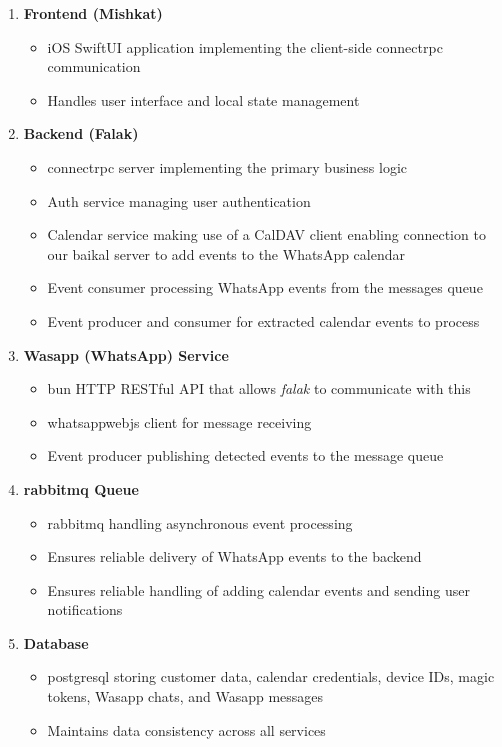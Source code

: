 \begin{enumerate}
    \item \textbf{Frontend (Mishkat)}
          \begin{itemize}
              \item iOS SwiftUI application implementing the client-side \gls{connectrpc} communication
              \item Handles user interface and local state management
          \end{itemize}

    \item \textbf{Backend (Falak)}
          \begin{itemize}
              \item \Gls{connectrpc} server implementing the primary business logic
              \item Auth service managing user authentication
              \item Calendar service making use of a CalDAV client enabling connection to our \Gls{baikal} server to add events to the WhatsApp calendar
              \item Event consumer processing WhatsApp events from the messages queue
              \item Event producer and consumer for extracted calendar events to process
          \end{itemize}

    \item \textbf{Wasapp (WhatsApp) Service}
          \begin{itemize}
              \item \gls{bun} HTTP RESTful API that allows \textit{falak} to communicate with this 
              \item \gls{whatsappwebjs} client for message receiving
              \item Event producer publishing detected events to the message queue
          \end{itemize}

    \item \textbf{\gls{rabbitmq} Queue}
          \begin{itemize}
              \item \gls{rabbitmq} handling asynchronous event processing
              \item Ensures reliable delivery of WhatsApp events to the backend
              \item Ensures reliable handling of adding calendar events and sending user notifications
          \end{itemize}

    \item \textbf{Database}
          \begin{itemize}
              \item \gls{postgresql} storing customer data, calendar credentials, device IDs, magic tokens, Wasapp chats, and Wasapp messages
              \item Maintains data consistency across all services
          \end{itemize}
\end{enumerate}

